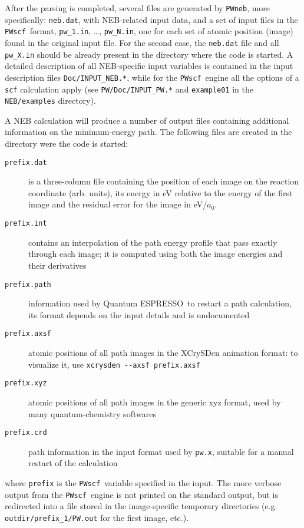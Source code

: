\documentclass[12pt,a4paper]{article}
\def\qe{{\sc Quantum ESPRESSO}}
\def\NEB{\texttt{PWneb}} %
\def\pwx{\texttt{pw.x}}
\def\PWscf{\texttt{PWscf}}
\begin{document}
After the parsing is completed, several files are generated by \NEB, more 
specifically: \texttt{neb.dat}, with NEB-related input data, 
and a set of input files in the \PWscf\ format, \texttt{pw\_1.in}, \ldots,
\texttt{pw\_N.in}, one for each set of atomic position (image) found in 
the original input file.
For the second case, the \texttt{neb.dat} file and all \texttt{pw\_X.in} 
should be already present in the directory where the code is started.
A detailed description of all NEB-specific input variables is contained 
in the input description files \texttt{Doc/INPUT\_NEB.*}, while for the
\PWscf\ engine all the options of a \texttt{scf} calculation apply (see
\texttt{PW/Doc/INPUT\_PW.*} and \texttt{example01} in the 
\texttt{NEB/examples} directory). 

A NEB calculation will produce a number of output files containing additional 
information on the minimum-energy path. The following files are created in the
directory were the code is started:
\begin{description}
\item[\texttt{prefix.dat}]
is a three-column file containing the position of each image on the reaction
coordinate (arb. units), its energy in eV relative to the energy of the first image
and the residual error for the image in eV/$a_0$.
\item[\texttt{prefix.int}]
contains an interpolation of the path energy profile that pass exactly through each
image; it is computed using both the image energies and their derivatives
\item[\texttt{prefix.path}]
information used by \qe\ 
to restart a path calculation, its format depends on the input
details and is undocumented
\item[\texttt{prefix.axsf}]
atomic positions of all path images in the XCrySDen animation format:
to visualize it, use \texttt{xcrysden -\--axsf prefix.axsf}
\item[\texttt{prefix.xyz}]
atomic positions of all path images in the generic xyz format, used by
many quantum-chemistry softwares
\item[\texttt{prefix.crd}]
path information in the input format used by \pwx, suitable for a manual
restart of the calculation
\end{description}
where \texttt{prefix} is the \PWscf\ variable specified in the input.
The more verbose output from the \PWscf\ engine is not printed on the standard
output, but is redirected into a file stored in the image-specific temporary 
directories (e.g. \texttt{outdir/prefix\_1/PW.out} for the first image, etc.).
\end{document}
